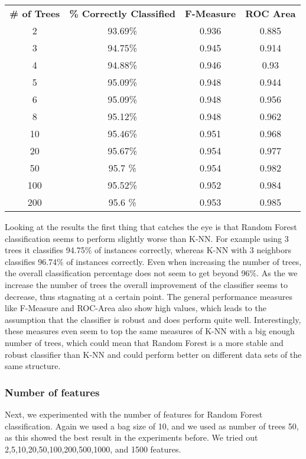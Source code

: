 \documentclass{article}
\begin{document}
\begin{center}
\begin{tabular}{ c | c | c | c}
\textbf{\# of Trees} & \textbf{\% Correctly Classified} & \textbf{F-Measure} & \textbf{ROC Area}\\
2   & 93.69\% & 0.936 & 0.885\\
3   & 94.75\% & 0.945 & 0.914\\
4   & 94.88\% & 0.946 & 0.93\\
5   & 95.09\% & 0.948 & 0.944\\
6   & 95.09\% & 0.948 & 0.956\\
8   & 95.12\% & 0.948 & 0.962\\
10  & 95.46\% & 0.951 & 0.968\\
20  & 95.67\% & 0.954 & 0.977\\
50  & 95.7 \% & 0.954 & 0.982\\
100 & 95.52\% & 0.952 & 0.984\\
200 & 95.6 \% & 0.953 & 0.985\\
\end{tabular}
\end{center}

Looking at the results the first thing that catches the eye is that Random Forest classification seems to perform slightly worse than K-NN. For example using 3 trees it classifies 94.75\% of instances correctly, whereas K-NN with 3 neighbors classifies 96.74\% of instances correctly. Even when increasing the number of trees, the overall classification percentage does not seem to get beyond 96\%. As the we increase the number of trees the overall improvement of the classifier seems to decrease, thus stagnating at a certain point. The general performance measures like F-Measure and ROC-Area also show high values, which leads to the assumption that the classifier is robust and does perform quite well. Interestingly, these measures even seem to top the same measures of K-NN with a big enough number of trees, which could mean that Random Forest is a more stable and robust classifier than K-NN and could perform better on different data sets of the same structure.

\subsubsection{Number of features}
Next, we experimented with the number of features for Random Forest classification. Again we used a bag size of 10, and we used as number of trees 50, as this showed the best result in the experiments before. We tried out 2,5,10,20,50,100,200,500,1000, and 1500 features.
\end{document}
